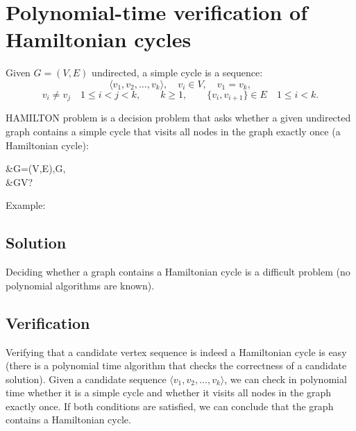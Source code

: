 \section{Polynomial-time verification of Hamiltonian cycles}

Given $G=(V,E)$ undirected, a simple cycle is a sequence:
\[
\langle v_1,v_2,\ldots,v_k\rangle,\quad v_i\in V,\quad v_1=v_k,
\]
\[
v_i\neq v_j\quad1\leq i<j<k,\qquad k\geq1,\qquad
\{v_i,v_{i+1}\}\in E\quad1\leq i<k.
\]

HAMILTON problem is a decision problem that asks whether a given undirected graph contains a simple cycle that visits all nodes in the graph exactly once (a Hamiltonian cycle):
\begin{notesproblem}
&\langle G=(V,E)\rangle,\quad G,\\
&GV?
\end{notesproblem}
Example:

\subsection{Solution}
Deciding whether a graph contains a Hamiltonian cycle is a difficult problem (no polynomial algorithms are known).
\subsection{Verification}
Verifying that a candidate vertex sequence is indeed a Hamiltonian cycle is easy (there is a polynomial time algorithm that checks the correctness of a candidate solution). Given a candidate sequence $\langle v_1,v_2,\ldots,v_k\rangle$, we can check in polynomial time whether it is a simple cycle and whether it visits all nodes in the graph exactly once. If both conditions are satisfied, we can conclude that the graph contains a Hamiltonian cycle.
